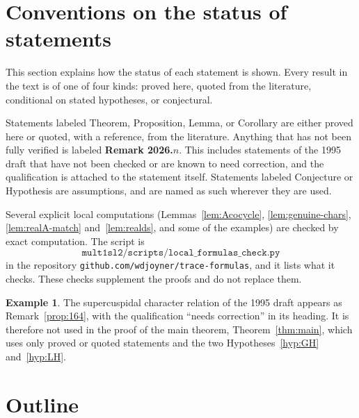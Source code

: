 \documentclass[12pt,letterpaper]{book}
\theoremstyle{plain}
\theoremstyle{definition}
\newtheorem{example}[theorem]{Example}
\theoremstyle{remark}
\theoremstyle{remark}
\begin{document}
\section{Conventions on the status of statements}

This section explains how the status of each statement is shown. Every
result in the text is of one of four kinds: proved here, quoted from the
literature, conditional on stated hypotheses, or conjectural.

Statements labeled Theorem, Proposition, Lemma, or Corollary are either
proved here or quoted, with a reference, from the literature. Anything that
has not been fully verified is labeled \textbf{Remark 2026.$n$}. This
includes statements of the 1995 draft that have not been checked or are
known to need correction, and the qualification is attached to the
statement itself. Statements labeled Conjecture or Hypothesis are
assumptions, and are named as such wherever they are used.

Several explicit local computations (Lemmas~\ref{lem:Acocycle},
\ref{lem:genuine-chars}, \ref{lem:realA-match} and~\ref{lem:realds}, and
some of the examples) are checked by exact computation. The script is
\[
\texttt{mult1sl2/scripts/local\_formulas\_check.py}
\]
in the repository \texttt{github.com/wdjoyner/trace-formulas}, and it
lists what it checks. These checks supplement the proofs and do not replace them.

\begin{example}
The supercuspidal character relation of the 1995 draft appears as
Remark~\ref{prop:164}, with the qualification ``needs correction'' in its
heading. It is therefore not used in the proof of the main theorem,
Theorem~\ref{thm:main}, which uses only proved or quoted statements and
the two Hypotheses~\ref{hyp:GH} and~\ref{hyp:LH}.
\end{example}

\section{Outline}
\end{document}
